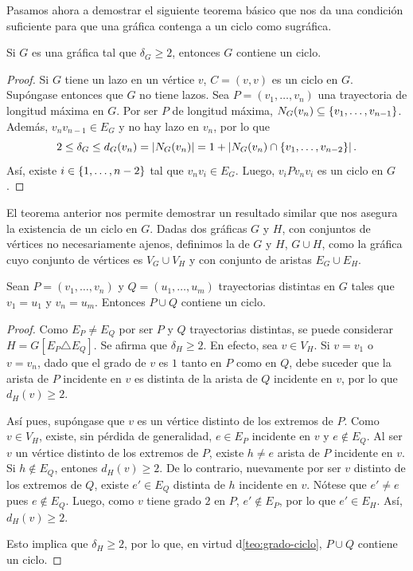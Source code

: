 Pasamos ahora a demostrar el siguiente teorema b\'asico que nos da una
condici\'on suficiente para que una gr\'afica contenga a un ciclo como
sugr\'afica.

\begin{teorema}
\label{teo:grado-ciclo}
    Si $G$ es una gr\'afica tal que $\delta_G \ge 2$, entonces $G$ contiene un
    ciclo.
\end{teorema}
  
\begin{proof}
  Si $G$ tiene un lazo en un v\'ertice $v$, $C=(v,v)$ es un ciclo en $G$.
  Sup\'ongase entonces que $G$ no tiene lazos. Sea $P=(v_1,\dots,v_n)$ una
  trayectoria de longitud m\'axima en $G$. Por ser $P$ de longitud m\'axima,
  $N_G(v_n)\subseteq \{v_1,\dots, v_{n-1}\}$. Adem\'as, $v_nv_{n-1}\in E_G$ y no hay
  lazo en $v_n$, por lo que
  \[
      2\leq \delta_G \leq d_G(v_n) = \left|N_G(v_n)\right| = 1 + 
      \left|N_G(v_n)\cap \{v_1,\dots, v_{n-2}\}\right|.
  \]
  As\'i, existe $i\in\{1,\dots, n-2\}$ tal que $v_nv_i\in E_G$. Luego,
  $v_iPv_nv_i$ es un ciclo en $G$.

\end{proof}

El teorema anterior nos permite demostrar un resultado similar que nos asegura
la existencia de un ciclo en $G$. Dadas dos gr\'aficas $G$ y $H$, con conjuntos
de v\'ertices no necesariamente ajenos, definimos la  de $G$ y
$H$, $G \cup H$, como la gr\'afica cuyo conjunto de v\'ertices es $V_G\cup V_H$
y con conjunto de aristas $E_G\cup E_H$.

\begin{proposicion}
\label{pro:trayectoria-ciclo}
    Sean $P=(v_1,\dots,v_n)$ y $Q=(u_1,\dots,u_m)$ trayectorias distintas en $G$
    tales que $v_1=u_1$ y $v_n=u_m$. Entonces $P\cup Q$ contiene un ciclo.
\end{proposicion}
  
\begin{proof}
  Como $E_P\neq E_Q$ por ser $P$ y $Q$ trayectorias distintas, se puede
  considerar $H=G[E_P\triangle E_Q]$. Se afirma que $\delta_H\ge 2$. En efecto,
  sea $v\in V_H$. Si $v=v_1$ o $v=v_n$, dado que el grado de $v$ es $1$ tanto en
  $P$ como en $Q$, debe suceder que la arista de $P$ incidente en $v$ es
  distinta de la arista de $Q$ incidente en $v$, por lo que $d_H(v)\ge 2$.
  
  As\'i pues, sup\'ongase que $v$ es un v\'ertice distinto de los extremos de
  $P$. Como $v\in V_H$, existe, sin p\'erdida de generalidad, $e\in E_P$
  incidente en $v$ y $e\notin E_Q$. Al ser $v$ un v\'ertice distinto de los
  extremos de $P$, existe $h\neq e$ arista de $P$ incidente en $v$. Si $h\notin
  E_Q$, entones $d_H(v)\ge 2$. De lo contrario, nuevamente por ser $v$ distinto
  de los extremos de $Q$, existe $e'\in E_Q$ distinta de $h$ incidente en $v$.
  N\'otese que $e'\neq e$ pues $e\notin E_Q$. Luego, como $v$ tiene grado $2$ en
  $P$, $e'\notin E_P$, por lo que $e'\in E_H$. As\'i, $d_H(v)\ge 2$.

  Esto implica que $\delta_H\ge 2$, por lo que, en virtud
  d\cref{teo:grado-ciclo}, $P\cup Q$ contiene un ciclo.

\end{proof}

